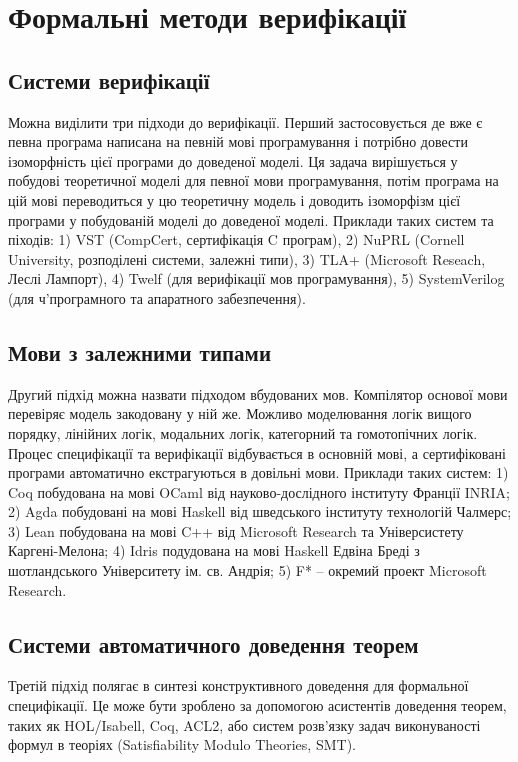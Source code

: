 \section{Формальні методи верифікації}

\subsection{Системи верифікації}
Можна виділити три підходи до верифікації.
Перший застосовується де вже є
певна програма написана на певній мові програмування і потрібно довести ізоморфність
цієї програми до доведеної моделі. Ця задача вирішується у побудові теоретичної моделі
для певної мови програмування, потім програма на цій мові переводиться у цю
теоретичну модель і доводить ізоморфізм цієї програми у побудованій моделі до доведеної моделі.
Приклади таких систем та піходів: 1) VST (CompCert, сертифікація C програм),
2) NuPRL (Cornell University, розподілені системи, залежні типи),
3) TLA+ (Microsoft Reseach, Леслі Лампорт),
4) Twelf (для верифікації мов програмування), 5) SystemVerilog (для
ч'програмного та апаратного забезпечення).

\subsection{Мови з залежними типами}
Другий підхід можна назвати підходом вбудованих мов.
Компілятор основої мови перевіряє модель закодовану у ній же. Можливо моделювання
логік вищого порядку, лінійних логік, модальних логік, категорний та гомотопічних логік.
Процес специфікації та верифікації відбувається в основній мові, а сертифіковані програми
автоматично екстрагуються в довільні мови.
Приклади таких систем: 1) Coq побудована на мові OCaml від науково-дослідного
інституту Франції INRIA; 2) Agda побудовані на мові Haskell від шведського інституту технологій Чалмерс;
3) Lean побудована на мові C++ від Microsoft Research та Універсистету Каргені-Мелона;
4) Idris подудована на мові Haskell Едвіна Бреді з шотландського Університету ім. св. Андрія;
5) F* -- окремий проект Microsoft Research.

\subsection{Системи автоматичного доведення теорем}
Третій підхід полягає в синтезі конструктивного доведення
для формальної специфікації. Це може бути зроблено за
допомогою асистентів доведення теорем, таких як HOL/Isabell, Coq, ACL2,
або систем розв'язку задач виконуваності формул в теоріях (Satisfiability Modulo Theories, SMT).

